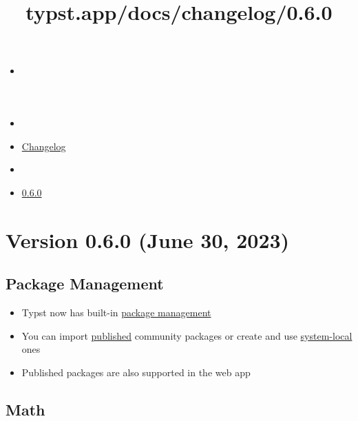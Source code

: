 \title{typst.app/docs/changelog/0.6.0}

\begin{itemize}
\tightlist
\item
  \href{/docs}{}
\item
  
\item
  \href{/docs/changelog/}{Changelog}
\item
  
\item
  \href{/docs/changelog/0.6.0/}{0.6.0}
\end{itemize}

\section{Version 0.6.0 (June 30,
2023)}\label{version-0.6.0-june-30-2023}

\subsection{Package Management}\label{package-management}

\begin{itemize}
\tightlist
\item
  Typst now has built-in
  \href{/docs/reference/scripting/\#packages}{package management}
\item
  You can import \href{https://typst.app/universe/}{published} community
  packages or create and use
  \href{https://github.com/typst/packages\#local-packages}{system-local}
  ones
\item
  Published packages are also supported in the web app
\end{itemize}

\subsection{Math}\label{math}

